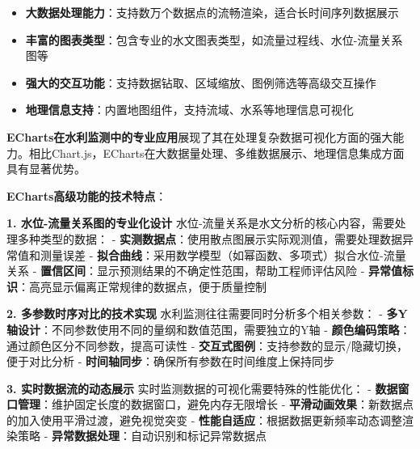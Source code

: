 \begin{itemize}
\tightlist
\item
  \textbf{大数据处理能力}：支持数万个数据点的流畅渲染，适合长时间序列数据展示
\item
  \textbf{丰富的图表类型}：包含专业的水文图表类型，如流量过程线、水位-流量关系图等
\item
  \textbf{强大的交互功能}：支持数据钻取、区域缩放、图例筛选等高级交互操作
\item
  \textbf{地理信息支持}：内置地图组件，支持流域、水系等地理信息可视化
\end{itemize}

\textbf{ECharts在水利监测中的专业应用}展现了其在处理复杂数据可视化方面的强大能力。相比Chart.js，ECharts在大数据量处理、多维数据展示、地理信息集成方面具有显著优势。

\textbf{ECharts高级功能的技术特点}：

\textbf{1. 水位-流量关系图的专业化设计} 水位-流量关系是水文分析的核心内容，需要处理多种类型的数据： - \textbf{实测数据点}：使用散点图展示实际观测值，需要处理数据异常值和测量误差 - \textbf{拟合曲线}：采用数学模型（如幂函数、多项式）拟合水位-流量关系 - \textbf{置信区间}：显示预测结果的不确定性范围，帮助工程师评估风险 - \textbf{异常值标识}：高亮显示偏离正常规律的数据点，便于质量控制

\textbf{2. 多参数时序对比的技术实现} 水利监测往往需要同时分析多个相关参数： - \textbf{多Y轴设计}：不同参数使用不同的量纲和数值范围，需要独立的Y轴 - \textbf{颜色编码策略}：通过颜色区分不同参数，提高可读性 - \textbf{交互式图例}：支持参数的显示/隐藏切换，便于对比分析 - \textbf{时间轴同步}：确保所有参数在时间维度上保持同步

\textbf{3. 实时数据流的动态展示} 实时监测数据的可视化需要特殊的性能优化： - \textbf{数据窗口管理}：维护固定长度的数据窗口，避免内存无限增长 - \textbf{平滑动画效果}：新数据点的加入使用平滑过渡，避免视觉突变 - \textbf{性能自适应}：根据数据更新频率动态调整渲染策略 - \textbf{异常数据处理}：自动识别和标记异常数据点

